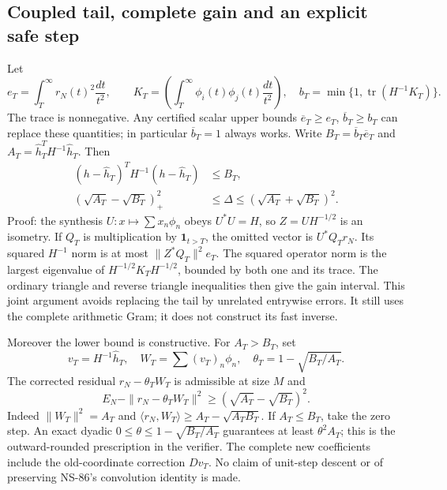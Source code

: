 \subsection{Coupled tail, complete gain and an explicit safe step}
Let
\[
 e_T=\int_T^\infty r_N(t)^2\frac{dt}{t^2},\qquad
 K_T=\left(\int_T^\infty\phi_i(t)\phi_j(t)\frac{dt}{t^2}\right),
 \quad b_T=\min\{1,\operatorname{tr}(H^{-1}K_T)\}.
\]
The trace is nonnegative. Any certified scalar upper bounds
$\overline e_T\ge e_T$, $\overline b_T\ge b_T$ can replace these quantities;
in particular $\overline b_T=1$ always works. Write $B_T=\overline b_T\overline e_T$
and $A_T=\widehat h_T^TH^{-1}\widehat h_T$. Then
\begin{align}
 (h-\widehat h_T)^TH^{-1}(h-\widehat h_T)&\le B_T,
 \label{eq:ns87-tail-metric}\\
 (\sqrt{A_T}-\sqrt{B_T})_+^2
 &\le\Delta\le(\sqrt{A_T}+\sqrt{B_T})^2.
 \label{eq:ns87-gain-interval}
\end{align}
Proof: the synthesis $U:x\mapsto\sum x_n\phi_n$ obeys $U^*U=H$,
so $Z=UH^{-1/2}$ is an isometry. If $Q_T$ is multiplication by
$\boldsymbol1_{t>T}$, the omitted vector is $U^*Q_Tr_N$. Its squared
$H^{-1}$ norm is at most $\|Z^*Q_T\|^2e_T$.
The squared operator norm is the largest eigenvalue of
$H^{-1/2}K_TH^{-1/2}$, bounded by both one and its trace. The ordinary
triangle and reverse triangle inequalities then give the gain interval.
This joint argument avoids replacing the tail by unrelated entrywise errors.
It still uses the complete arithmetic Gram; it does not construct its fast inverse.

Moreover the lower bound is constructive. For $A_T>B_T$, set
\[
 v_T=H^{-1}\widehat h_T,\quad
 W_T=\sum(v_T)_n\phi_n,\quad
 \theta_T=1-\sqrt{B_T/A_T}.
\]
The corrected residual $r_N-\theta_TW_T$ is admissible at size $M$ and
\begin{equation}
 E_N-\|r_N-\theta_TW_T\|^2
 \ge(\sqrt{A_T}-\sqrt{B_T})^2.
 \label{eq:ns87-safe-step}
\end{equation}
Indeed $\|W_T\|^2=A_T$ and
$\langle r_N,W_T\rangle\ge A_T-\sqrt{A_TB_T}$.
If $A_T\le B_T$, take the zero step. An exact dyadic
$0\le\theta\le1-\sqrt{B_T/A_T}$ guarantees at least $\theta^2A_T$;
this is the outward-rounded prescription in the verifier.
The complete new coefficients include the old-coordinate correction $Dv_T$.
No claim of unit-step descent or of preserving NS-86's convolution identity is made.

